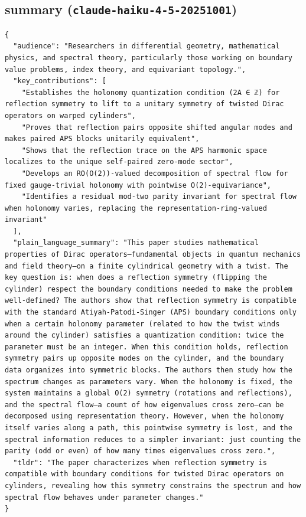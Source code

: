 \documentclass[11pt]{article}
\begin{document}
\subsection*{summary (\texttt{claude-haiku-4-5-20251001})}
\begin{verbatim}
{
  "audience": "Researchers in differential geometry, mathematical physics, and spectral theory, particularly those working on boundary value problems, index theory, and equivariant topology.",
  "key_contributions": [
    "Establishes the holonomy quantization condition (2A ∈ ℤ) for reflection symmetry to lift to a unitary symmetry of twisted Dirac operators on warped cylinders",
    "Proves that reflection pairs opposite shifted angular modes and makes paired APS blocks unitarily equivalent",
    "Shows that the reflection trace on the APS harmonic space localizes to the unique self-paired zero-mode sector",
    "Develops an RO(O(2))-valued decomposition of spectral flow for fixed gauge-trivial holonomy with pointwise O(2)-equivariance",
    "Identifies a residual mod-two parity invariant for spectral flow when holonomy varies, replacing the representation-ring-valued invariant"
  ],
  "plain_language_summary": "This paper studies mathematical properties of Dirac operators—fundamental objects in quantum mechanics and field theory—on a finite cylindrical geometry with a twist. The key question is: when does a reflection symmetry (flipping the cylinder) respect the boundary conditions needed to make the problem well-defined? The authors show that reflection symmetry is compatible with the standard Atiyah-Patodi-Singer (APS) boundary conditions only when a certain holonomy parameter (related to how the twist winds around the cylinder) satisfies a quantization condition: twice the parameter must be an integer. When this condition holds, reflection symmetry pairs up opposite modes on the cylinder, and the boundary data organizes into symmetric blocks. The authors then study how the spectrum changes as parameters vary. When the holonomy is fixed, the system maintains a global O(2) symmetry (rotations and reflections), and the spectral flow—a count of how eigenvalues cross zero—can be decomposed using representation theory. However, when the holonomy itself varies along a path, this pointwise symmetry is lost, and the spectral information reduces to a simpler invariant: just counting the parity (odd or even) of how many times eigenvalues cross zero.",
  "tldr": "The paper characterizes when reflection symmetry is compatible with boundary conditions for twisted Dirac operators on cylinders, revealing how this symmetry constrains the spectrum and how spectral flow behaves under parameter changes."
}
\end{verbatim}
\end{document}
